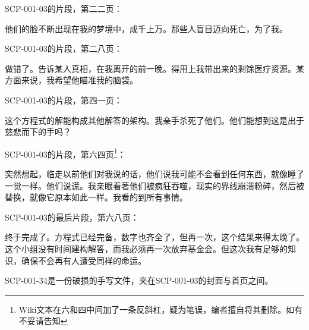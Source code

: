 SCP-001-03的片段，第二二页：

\begin{scpbox}
他们的脸不断出现在我的梦境中，成千上万。那些人盲目迈向死亡，为了我。
\end{scpbox}

SCP-001-03的片段，第二八页：

\begin{scpbox}
做错了。告诉某人真相，在我离开的前一晚。得用上我带出来的剩馀医疗资源。某方面来说，我希望他瞄准我的脑袋。
\end{scpbox}

SCP-001-03的片段，第四一页：

\begin{scpbox}
这个方程式的解能构成其他解答的架构。我亲手杀死了他们。他们能想到这是出于慈悲而下的手吗？
\end{scpbox}

SCP-001-03的片段，第六四页\footnote{Wiki文本在六和四中间加了一条反斜杠，疑为笔误，编者\QIS 擅自将其删除。如有不妥请告知}：

\begin{scpbox}
突然想起，临走以前他们对我说的话，他们说我可能不会看到任何东西，就像睡了一觉一样。他们说谎。我亲眼看著他们被疯狂吞噬，现实的界线崩溃粉碎，然后被替换，就像它原本如此一样。我看的到所有事情。
\end{scpbox}

SCP-001-03的最后片段，第六八页：

\begin{scpbox}
终于完成了。方程式已经完备，数字也齐全了，但再一次，这个结果来得太晚了。这个小组没有时间建构解答，而我必须再一次放弃基金会。但这次我有足够的知识，确保不会再有人遭受同样的命运。
\end{scpbox}

SCP-001-34是一份破损的手写文件，夹在SCP-001-03的封面与首页之间。

